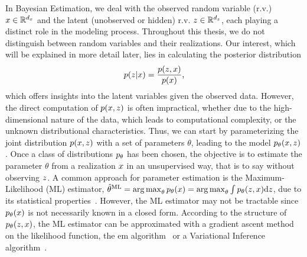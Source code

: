 In Bayesian Estimation, we deal with the observed random variable
 (r.v.) $x \in \mathbb{R}^{d_x}$ 
and the latent (unobserved or hidden) r.v. $z \in \mathbb{R}^{d_z}$, 
each playing a distinct role in the modeling process.
Throughout this thesis, we do not distinguish between random variables and their
realizations.
Our interest, which will be explained in more detail later, lies in calculating
the posterior distribution
\begin{equation*}
    \label{eq:posterior}
    p(z|x) = \frac{p( z, x)}{p(x)} \text{,}
\end{equation*}
which offers insights into the latent variables given
the observed data.
However, the direct computation of $p(x, z)$ 
is often impractical, whether due to the high-dimensional nature of the data,
which leads to computational complexity, or the unknown distributional
characteristics.
Thus, we can start by parameterizing the joint distribution $p(x, z)$ 
with a set of parameters $\theta$,
leading to the model  $p_{\theta}(x, z)$.
Once a class of distributions $p_{\theta}$ has been chosen, the
objective is to estimate the parameter  $\theta$ from a realization $x$
in an unsupervised way, that is to say without observing $z$.
A common approach for parameter estimation is the Maximum-Likelihood (ML)
estimator,
$\hat{\theta}^{\mathrm{ML}} = \operatorname*{arg\,max}_{\theta} p_{\theta}(x) = \operatorname*{arg\,max}_{\theta} \int p_{\theta}(z, x) \mathrm{d} z$,
due to its statistical properties~\citep{Hube67,White-MLE}. 
However,  the ML estimator may not be tractable since $p_{\theta}(x)$ 
is not necessarily known
in a closed form. 
According to the
structure of $p_{\theta}(z,x)$, the ML estimator can be approximated with a
gradient ascent method on the likelihood function, the
\gls*{em}
algorithm~\citep{dempster1977maximum} or a  
Variational Inference 
algorithm~\citep{jaakkola2000bayesian,Blei_2017}.

